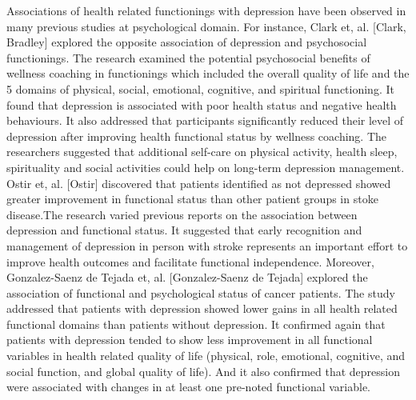 \documentclass[runningheads]{llncs}
\begin{document}
Associations of health related functionings with depression have been observed in many previous studies at psychological domain. For instance, Clark et, al. [Clark, Bradley] explored the opposite association of depression and psychosocial functionings. The research examined the potential psychosocial benefits of wellness coaching in functionings which included the overall quality of life and the 5 domains of physical, social, emotional, cognitive, and spiritual functioning. It found that depression is associated with poor health status and negative health behaviours. It also addressed that participants significantly reduced their level of depression after improving health functional status by wellness coaching. The researchers suggested that additional self-care on physical activity, health sleep, spirituality and social activities could help on long-term depression management. Ostir et, al. [Ostir] discovered that patients identified as not depressed showed greater improvement in functional status than other patient groups in stoke disease.The research varied previous reports on the association between depression and functional status. It suggested that early recognition and management of depression in person with stroke represents an important effort to improve health outcomes and facilitate functional independence. Moreover, Gonzalez-Saenz de Tejada et, al. [Gonzalez-Saenz de Tejada] explored the association of functional and psychological status of cancer patients. The study addressed that patients with depression showed lower gains in all health related functional domains than patients without depression. It confirmed again that patients with depression tended to show less improvement in all functional variables in health related quality of life (physical, role, emotional, cognitive, and social function, and global quality of life). And it also confirmed that depression were associated with changes in at least one pre-noted functional variable.
\end{document}
